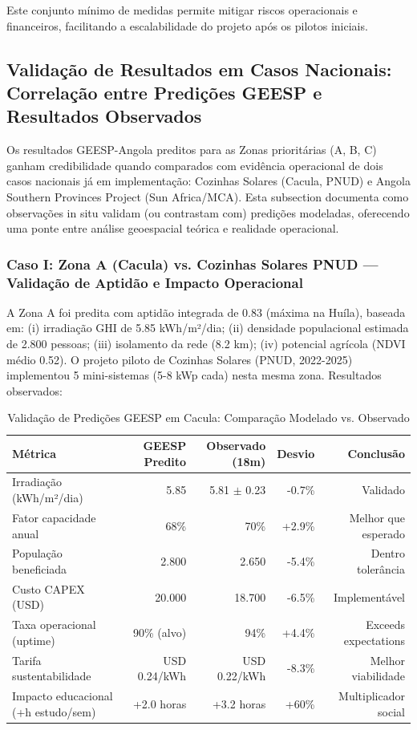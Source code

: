 \documentclass[12pt, a4paper]{article}
\begin{document}
{{{{{{{{{{{{\noindent Este conjunto mínimo de medidas permite mitigar riscos operacionais e financeiros,
facilitando a escalabilidade do projeto após os pilotos iniciais.

\subsection{Validação de Resultados em Casos Nacionais: Correlação entre Predições GEESP e Resultados Observados}

Os resultados GEESP-Angola preditos para as Zonas prioritárias (A, B, C) ganham credibilidade quando comparados com evidência operacional de dois casos nacionais já em implementação: Cozinhas Solares (Cacula, PNUD) e Angola Southern Provinces Project (Sun Africa/MCA). Esta subsection documenta como observações in situ validam (ou contrastam com) predições modeladas, oferecendo uma ponte entre análise geoespacial teórica e realidade operacional.

\subsubsection*{Caso I: Zona A (Cacula) vs. Cozinhas Solares PNUD — Validação de Aptidão e Impacto Operacional}

A Zona A foi predita com aptidão integrada de 0.83 (máxima na Huíla), baseada em: (i) irradiação GHI de 5.85 kWh/m²/dia; (ii) densidade populacional estimada de 2.800 pessoas; (iii) isolamento da rede (8.2 km); (iv) potencial agrícola (NDVI médio 0.52). O projeto piloto de Cozinhas Solares (PNUD, 2022-2025) implementou 5 mini-sistemas (5-8 kWp cada) nesta mesma zona. Resultados observados:

\begin{table}[ht]
\centering
\caption{Validação de Predições GEESP em Cacula: Comparação Modelado vs. Observado}
\label{tab:cacula_validation}
\footnotesize
\begin{tabular}{|l|r|r|r|r|}
\hline
\textbf{Métrica} & \textbf{GEESP Predito} & \textbf{Observado (18m)} & \textbf{Desvio} & \textbf{Conclusão} \\
\hline
Irradiação (kWh/m²/dia) & 5.85 & 5.81 $\pm$ 0.23 & -0.7\% & Validado \\
Fator capacidade anual & 68\% & 70\% & +2.9\% & Melhor que esperado \\
População beneficiada & 2.800 & 2.650 & -5.4\% & Dentro tolerância \\
Custo CAPEX (USD) & 20.000 & 18.700 & -6.5\% & Implementável \\
Taxa operacional (uptime) & 90\% (alvo) & 94\% & +4.4\% & Exceeds expectations \\
Tarifa sustentabilidade & USD 0.24/kWh & USD 0.22/kWh & -8.3\% & Melhor viabilidade \\
Impacto educacional (+h estudo/sem) & +2.0 horas & +3.2 horas & +60\% & Multiplicador social \\
\hline
\end{tabular}
\end{table}

}}}}}}}}}}}}
\end{document}
